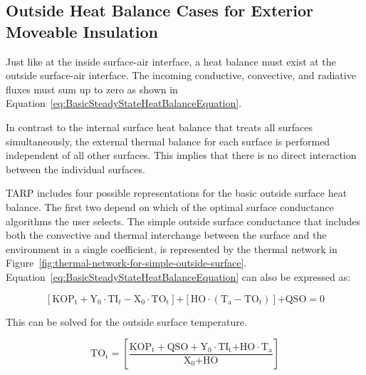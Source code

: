 \subsection{Outside Heat Balance Cases for Exterior Moveable Insulation}\label{outside-heat-balance-cases-for-exterior-moveable-insulation}

Just like at the inside surface-air interface, a heat balance must exist at the outside surface-air interface. The incoming conductive, convective, and radiative fluxes must sum up to zero as shown in Equation~\ref{eq:BasicSteadyStateHeatBalanceEquation}.

In contrast to the internal surface heat balance that treats all surfaces simultaneously, the external thermal balance for each surface is performed independent of all other surfaces. This implies that there is no direct interaction between the individual surfaces.

TARP includes four possible representations for the basic outside surface heat balance. The first two depend on which of the optimal surface conductance algorithms the user selects. The simple outside surface conductance that includes both the convective and thermal interchange between the surface and the environment in a single coefficient, is represented by the thermal network in Figure~\ref{fig:thermal-network-for-simple-outside-surface}. Equation~\ref{eq:BasicSteadyStateHeatBalanceEquation} can also be expressed as:

\begin{equation}
\left[ {{\mathrm{KO}}{{\mathrm{P}}_{\mathrm{t}}} + {{\mathrm{Y}}_{\mathrm{0}}}\cdot {\mathrm{T}}{{\mathrm{I}}_t} - {{\mathrm{X}}_{\mathrm{0}}}\cdot {\mathrm{T}}{{\mathrm{O}}_{\mathrm{t}}}} \right]{\mathrm{ + }}\left[ {{\mathrm{HO}}\cdot \left( {{{\mathrm{T}}_{\mathrm{a}}} - {\mathrm{T}}{{\mathrm{O}}_t}} \right)} \right]{\mathrm{  + QSO  =  0}}
\end{equation}

This can be solved for the outside surface temperature.

\begin{equation}
{\mathrm{T}}{{\mathrm{O}}_{\mathrm{t}}}{\mathrm{ = }}\left[ {\frac{{{\mathrm{KO}}{{\mathrm{P}}_{\mathrm{t}}} + {\mathrm{QSO}} + {{\mathrm{Y}}_0}\cdot {\mathrm{T}}{{\mathrm{I}}_{\mathrm{t}}}{\mathrm{ + HO}}\cdot {{\mathrm{T}}_{\mathrm{a}}}}}{{{{\mathrm{X}}_{\mathrm{0}}}{\mathrm{ + HO}}}}} \right]{\mathrm{  }}
\label{eq:OutsideSurfTempHeatBalEq}
\end{equation}

